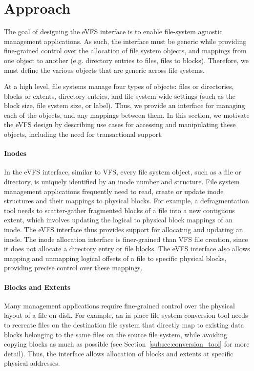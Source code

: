 \vspace{-0.7em}
\section{Approach\label{sec:Approach}}
\vspace{-0.4em}

The goal of designing the eVFS interface is to enable file-system agnostic management applications. As such, the interface must be generic while providing fine-grained control over the allocation of file system objects, and mappings from one object to another (e.g. directory entries to files, files to blocks). Therefore, we must define the various objects that are generic across file systems.

At a high level, file systems manage four types of objects: files or directories, blocks or extents, directory entries, and file-system wide settings (such as the block size, file system size, or label). Thus, we provide an interface for managing each of the objects, and any mappings between them. In this section, we motivate the eVFS design by describing use cases for accessing and manipulating these objects, including the need for transactional support.

\vspace{-0.25em}
\paragraph{Inodes} In the eVFS interface, similar to VFS, every file system object, such as a file or directory, is uniquely identified by an inode number and structure. File system management applications frequently need to read, create or update inode structures and their mappings to physical blocks. For example, a defragmentation tool needs to scatter-gather fragmented blocks of a file into a new contiguous extent, which involves updating the logical to physical block mappings of an inode. The eVFS interface thus provides support for allocating and updating an inode. The inode allocation interface is finer-grained than VFS file creation, since it does not allocate a directory entry or file blocks. The eVFS interface also allows mapping and unmapping logical offsets of a file to specific physical blocks, providing precise control over these mappings.

\vspace{-0.25em}
\paragraph{Blocks and Extents} Many management applications require fine-grained control over the physical layout of a file on disk. For example, an in-place file system conversion tool needs to recreate files on the destination file system that directly map to existing data blocks belonging to the same files on the source file system, while avoiding copying blocks as much as possible (see Section~\ref{subsec:conversion_tool} for more detail). Thus, the interface allows allocation of blocks and extents at specific physical addresses.

